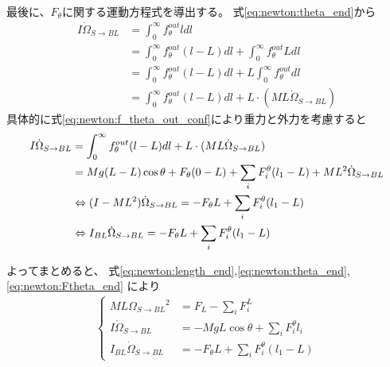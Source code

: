 \documentclass[a4paper,11pt]{jsarticle}
\begin{document}
最後に、$F_\theta$に関する運動方程式を導出する。
式\ref{eq:newton:theta_end}から
\begin{align*}
  I\dot\Omega_{S\rightarrow BL}{} 
  &= \int_0^\infty f_\theta^{out} l dl
  \\
  &= \int_0^\infty f_\theta^{out} ( l - L ) dl
  + \int_0^\infty f_\theta^{out} L dl
  \\
  &= \int_0^\infty f_\theta^{out} ( l - L ) dl
  + L \int_0^\infty f_\theta^{out} dl
  \\
  &= \int_0^\infty f_\theta^{out} ( l - L ) dl
  + L \cdot ( ML\dot\Omega_{S\rightarrow BL}{}) 
\end{align*}
具体的に式\ref{eq:newton:f_theta_out_conf}により重力と外力を考慮すると
\begin{align}
  I\dot\Omega_{S\rightarrow BL}{}
  &= \int_0^\infty f_\theta^{out} ( l - L ) dl
  + L \cdot ( ML\dot\Omega_{S\rightarrow BL}{}) 
  \notag
  \\
  &= Mg(L - L) \cos\theta + F_\theta ( 0 - L ) + \sum_i F_i^\theta ( l_1 - L ) + ML^2\dot\Omega_{S\rightarrow BL}{}
  \notag
  \\
  & \Leftrightarrow
  ( I - ML^2 ) \dot\Omega_{S\rightarrow BL}{} = - F_\theta L + \sum_i F_i^\theta ( l_1 - L )
  \notag
  \\
  & \Leftrightarrow
  I_{BL} \dot\Omega_{S\rightarrow BL}{} = - F_\theta L + \sum_i F_i^\theta ( l_1 - L )
  \label{eq:newton:Ftheta_end}
\end{align}

よってまとめると、
式\ref{eq:newton:length_end},\ref{eq:newton:theta_end},\ref{eq:newton:Ftheta_end}
により
\begin{align*}
  \begin{cases}
    ML\Omega_{S\rightarrow BL}{}^2 &= F_L - \sum_i F_i^{L}
    \\
    I\dot\Omega_{S\rightarrow BL}{} &= -MgL\cos\theta + \sum_i F_i^\theta l_i
    \\
    I_{BL} \dot\Omega_{S\rightarrow BL}{} &= - F_\theta L + \sum_i F_i^\theta ( l_1 - L )
  \end{cases}
\end{align*}
\end{document}
